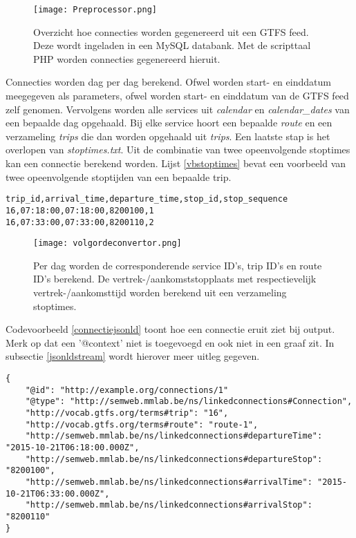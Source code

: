 \begin{figure}[h!]
\centering
\texttt{[image: Preprocessor.png]}
\caption{Overzicht hoe connecties worden gegenereerd uit een GTFS feed. Deze wordt ingeladen in een MySQL databank. Met de scripttaal PHP worden connecties gegenereerd hieruit.}
\label{inladengtfs}
\end{figure}

Connecties worden dag per dag berekend. Ofwel worden start- en einddatum meegegeven als parameters, ofwel worden start- en einddatum van de GTFS feed zelf genomen. Vervolgens worden alle services uit \textit{calendar} en \textit{calendar\_dates} van een bepaalde dag opgehaald. Bij elke service hoort een bepaalde \textit{route} en een verzameling \textit{trips} die dan worden opgehaald uit \textit{trips}.
Een laatste stap is het overlopen van \textit{stoptimes.txt}. Uit de combinatie van twee opeenvolgende stoptimes kan een connectie berekend worden. Lijst \ref{vbstoptimes} bevat een voorbeeld van twee opeenvolgende stoptijden van een bepaalde trip.

\begin{lstlisting}[label=vbstoptimes,caption=Vereenvoudigde stoptimes in CSV.]
trip_id,arrival_time,departure_time,stop_id,stop_sequence
16,07:18:00,07:18:00,8200100,1
16,07:33:00,07:33:00,8200110,2
\end{lstlisting}

\begin{figure}[h!]
\centering
\texttt{[image: volgordeconvertor.png]}
\caption{Per dag worden de corresponderende service ID's, trip ID's en route ID's berekend. De vertrek-/aankomststopplaats met respectievelijk vertrek-/aankomsttijd worden berekend uit een verzameling stoptimes. }
\end{figure}

Codevoorbeeld \ref{connectiejsonld} toont hoe een connectie eruit ziet bij output. Merk op dat een '@context' niet is toegevoegd en ook niet in een graaf zit. In subsectie \ref{jsonldstream} wordt hierover meer uitleg gegeven.

\begin{lstlisting}[label=connectiejsonld,caption=Connectie voor een bepaalde trip met bijkomstige route in JSON-LD.]
{	
	"@id": "http://example.org/connections/1"
	"@type": "http://semweb.mmlab.be/ns/linkedconnections#Connection",
	"http://vocab.gtfs.org/terms#trip": "16",
	"http://vocab.gtfs.org/terms#route": "route-1",
	"http://semweb.mmlab.be/ns/linkedconnections#departureTime": "2015-10-21T06:18:00.000Z",
	"http://semweb.mmlab.be/ns/linkedconnections#departureStop": "8200100",
	"http://semweb.mmlab.be/ns/linkedconnections#arrivalTime": "2015-10-21T06:33:00.000Z",
	"http://semweb.mmlab.be/ns/linkedconnections#arrivalStop": "8200110"
}
\end{lstlisting}

